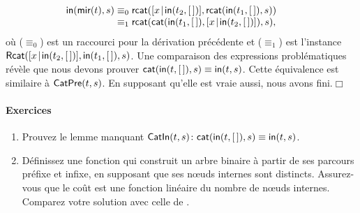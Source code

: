 \begin{equation*}
\begin{array}{@{}r@{\;}c@{\;}l@{\qquad}r@{}}
\fun{in}(\fun{mir}(t),s)
& \equiv_0
& \fun{rcat}(\cons{x}{\fun{in}(t_2,\el)},
  \fun{rcat}(\fun{in}(t_1,\el),s))\\
& \equiv_1
& \fun{rcat}(\fun{cat}(\fun{in}(t_1,\el),
  \cons{x}{\fun{in}(t_2,\el)}), s),\index{rcat@\fun{rcat/2}|)}
\end{array}
\end{equation*}
où (\(\equiv_0\)) est un raccourci pour la dérivation précédente et
(\(\equiv_1\)) est l'instance
\(\textsf{Rcat}({[{x}\!\mid\!{\textsf{in}(t_2,[\,])}], \textsf{in}(t_1,[\,]),
  s})\). Une comparaison des expressions problématiques révèle que nous
devons prouver \(\textsf{cat}(\textsf{in}(t,[\,]),s) \equiv
\textsf{in}(t,s)\). Cette équivalence est similaire à
\(\textsf{CatPre}({t,s})\). En supposant
qu'elle est vraie aussi, nous avons fini.\hfill\(\Box\)

\paragraph{Exercices}
\begin{enumerate}

  \item Prouvez le lemme manquant \(\textsf{CatIn}({t,s}) \colon
  \textsf{cat}(\textsf{in}(t,[\,]),s) \equiv
  \textsf{in}(t,s)\).

 \item Définissez une fonction qui construit un arbre binaire à partir
  de ses parcours préfixe et infixe, en supposant que ses nœuds
  internes sont distincts. Assurez-vous que le coût est une fonction
  linéaire du nombre de nœuds internes. Comparez votre solution
  avec celle de \cite{MuBird_2003}.

\end{enumerate}


